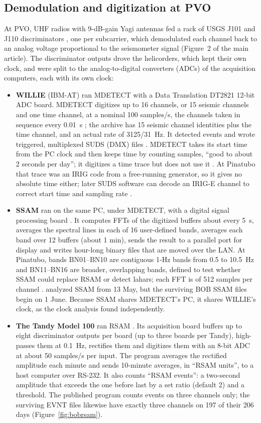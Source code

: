 \documentclass[11pt]{article}
\begin{document}
\subsection{Demodulation and digitization at PVO}

At PVO, UHF radios with 9-dB-gain Yagi antennas fed a rack of USGS J101 and J110 discriminators \citep{Lockhart_1996}, one per subcarrier, which demodulated each channel back to an analog voltage proportional to the seismometer signal (Figure~2 of the main article). The discriminator outputs drove the helicorders, which kept their own clock, and were split to the analog-to-digital converters (ADCs) of the acquisition computers, each with its own clock:
\begin{itemize}
\item \textbf{WILLIE} (IBM-AT) ran MDETECT \citep{Lee_1988,Tottingham_1989} with a Data Translation DT2821 12-bit ADC board. MDETECT digitizes up to 16 channels, or 15 seismic channels and one time channel, at a nominal 100 samples/s, the channels taken in sequence every 0.01~s \citep{Lee_1988}; the archive has 15 seismic channel identities plus the time channel, and an actual rate of 3125/31~Hz. It detected events and wrote triggered, multiplexed SUDS (DMX) files \citep{Ward_1989}. MDETECT takes its start time from the PC clock and then keeps time by counting samples, ``good to about 2 seconds per day''; it digitizes a time trace but does not use it \citep{Lee_1988}. At Pinatubo that trace was an IRIG code from a free-running generator, so it gives no absolute time either; later SUDS software can decode an IRIG-E channel to correct start time and sampling rate \citep{Banfill_1999}.
\item \textbf{SSAM} ran on the same PC, under MDETECT, with a digital signal processing board \citep{Rogers_1995}. It computes FFTs of the digitized buffers about every 5~s, averages the spectral lines in each of 16 user-defined bands, averages each band over 12 buffers (about 1 min), sends the result to a parallel port for display and writes hour-long binary files that are moved over the LAN. At Pinatubo, bands BN01--BN10 are contiguous 1-Hz bands from 0.5 to 10.5~Hz and BN11--BN16 are broader, overlapping bands, defined to test whether SSAM could replace RSAM or detect lahars; each FFT is of 512 samples per channel \citep{Power_1996}. \citet{Power_1996} analyzed SSAM from 13 May, but the surviving BOB SSAM files begin on 1 June. Because SSAM shares MDETECT's PC, it shares WILLIE's clock, as the clock analysis found independently.
\item \textbf{The Tandy Model 100} ran RSAM \citep{Murray_1989}. Its acquisition board buffers up to eight discriminator outputs per board (up to three boards per Tandy), high-passes them at 0.1~Hz, rectifies them and digitizes them with an 8-bit ADC at about 50 samples/s per input. The program averages the rectified amplitude each minute and sends 10-minute averages, in ``RSAM units'', to a host computer over RS-232. It also counts ``RSAM events'': a two-second amplitude that exceeds the one before last by a set ratio (default 2) and a threshold. The published program counts events on three channels only; the surviving EVNT files likewise have exactly three channels on 197 of their 206 days (Figure~\ref{fig:bobrsam}).

\end{itemize}
\end{document}
